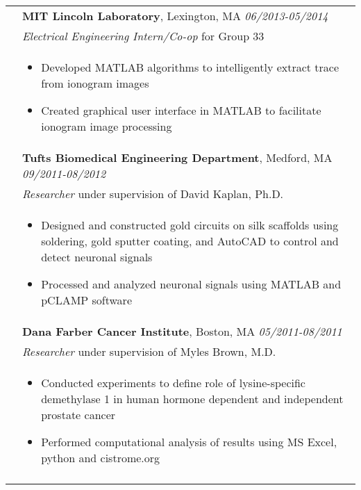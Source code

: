 \documentclass[letterpaper,11pt,oneside]{article}
\begin{document}
\begin{longtable}{@{} p{2.5cm} p{14.8cm}}
& \textbf{MIT Lincoln Laboratory}, Lexington, MA \hfill \textit{06/2013-05/2014} \\
& \textit{Electrical Engineering Intern/Co-op} for Group 33 \\ 
& 
\vspace{-7mm}
\begin{itemize}[leftmargin=.5cm]
	\setlength\itemsep{-0.3em}
	\item Developed MATLAB algorithms to intelligently extract trace from ionogram images
	\item Created graphical user interface in MATLAB to facilitate ionogram image processing
\end{itemize} 
\\

& \textbf{Tufts Biomedical Engineering Department}, Medford, MA \hfill \textit{09/2011-08/2012} \\
& \textit{Researcher} under supervision of David Kaplan, Ph.D. \\ 
& 
\vspace{-7mm}
\begin{itemize}[leftmargin=.5cm]
	\setlength\itemsep{-0.3em}
	\item Designed and constructed gold circuits on silk scaffolds using soldering, gold sputter coating, and AutoCAD to control and detect neuronal signals
	\item Processed and analyzed neuronal signals using MATLAB and pCLAMP software
\end{itemize} 
\\

& \textbf{Dana Farber Cancer Institute}, Boston, MA \hfill \textit{05/2011-08/2011} \\
& \textit{Researcher} under supervision of Myles Brown, M.D. \\ 
& 
\vspace{-7mm}
\begin{itemize}[leftmargin=.5cm]
	\setlength\itemsep{-0.3em}
	\item Conducted experiments to define role of lysine-specific demethylase 1 in human hormone dependent and independent prostate cancer
	\item Performed computational analysis of results using MS Excel, python and cistrome.org
\end{itemize} 
\\
& \\


\end{longtable}
\end{document}
